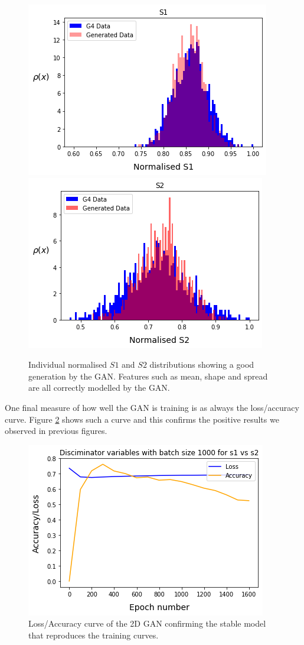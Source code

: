 \documentclass[11pt]{article} %
\begin{document}
\begin{figure}[H]
\centering
\includegraphics[scale=0.55]{images/2d_s1.png}
\includegraphics[scale=0.55]{images/2d_s2.png}
\caption{Individual normalised $S1$ and $S2$ distributions showing a good generation by the GAN. Features such as mean, shape and spread are all correctly modelled by the GAN.}
\label{fig:2DGANindividual}
\end{figure}

One final measure of how well the GAN is training is as always the loss/accuracy curve. Figure \ref{fig:2DGANloss} shows such a curve and this confirms the positive results we observed in previous figures.

\begin{figure}[H]
\centering
\includegraphics[scale=0.6]{images/2d_loss_graph_s1_s2.png}
\caption{Loss/Accuracy curve of the 2D GAN confirming the stable model that reproduces the training curves.}
\label{fig:2DGANloss}
\end{figure}
\end{document}
